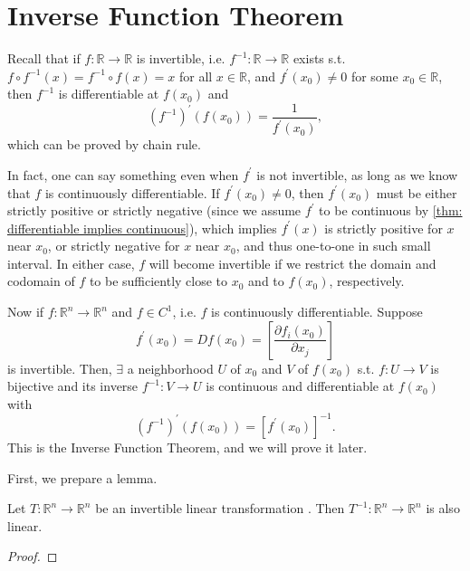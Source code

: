 \section{Inverse Function Theorem}
Recall that if \(f: \mathbb{R} \to \mathbb{R} \) is invertible, i.e. \(f^{-1} : \mathbb{R} \to \mathbb{R} \) exists s.t. \(f \circ f^{-1} (x) = f^{-1} \circ f (x) = x\) for all \(x \in \mathbb{R} \), and \(f^{\prime} (x_0) \neq 0\) for some \(x_0 \in \mathbb{R} \), then \(f^{-1}\) is differentiable at \(f(x_0)\) and  
\[
    \left( f^{-1} \right)^{\prime} (f(x_0)) = \frac{1}{f^{\prime} (x_0)},
\]      
which can be proved by chain rule.

In fact, one can say something even when \(f^{\prime} \) is not invertible, as long as we know that \(f\) is continuously differentiable. If \(f^{\prime} (x_0) \neq 0\), then \(f^{\prime} (x_0)\) must be either strictly positive or strictly negative (since we assume \(f^{\prime} \) to be continuous by \autoref{thm: differentiable implies continuous}), which implies \(f^{\prime} (x)\) is strictly positive for \(x\) near \(x_0\), or strictly negative for \(x\) near \(x_0\), and thus one-to-one in such small interval. In either case, \(f\) will become invertible if we restrict the domain and codomain of \(f\) to be sufficiently close to \(x_0\) and to \(f(x_0)\), respectively.            

 Now if \(f: \mathbb{R} ^n \to \mathbb{R} ^n\) and \(f \in C^1\), i.e. \(f\) is continuously differentiable. Suppose 
\[
    f^{\prime} (x_0) = Df(x_0) = \left[ \frac{\partial f_i(x_0)}{\partial x_j}  \right] 
\] 
is invertible. Then, \(\exists \) a neighborhood \(U\) of \(x_0\) and \(V\) of \(f(x_0)\) s.t. \(f: U \to V\) is bijective and its inverse \(f^{-1} : V \to U\) is continuous and differentiable at \(f(x_0)\) with 
\[
    \left( f^{-1} \right)^{\prime} (f(x_0)) = \left[ f^{\prime} (x_0) \right]^{-1}. 
\]       
This is the Inverse Function Theorem, and we will prove it later. 

First, we prepare a lemma. 
\begin{lemma} \label{lm: inverse of linear map is linear}
    Let \(T: \mathbb{R} ^n \to \mathbb{R} ^n\) be an invertible linear transformation . Then \(T^{-1} : \mathbb{R} ^n \to \mathbb{R} ^n\) is also linear.  
\end{lemma}
\begin{proof}
\end{proof}

